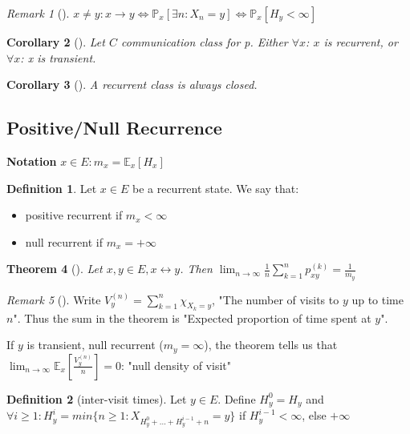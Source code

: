 \documentclass[12pt]{book}
\renewcommand{\iff}{\Leftrightarrow}
\newtheorem{theorem}{Theorem}[section]
\newtheorem{cor}[theorem]{Corollary}
\theoremstyle{definition}
\newtheorem{defn}{Definition}[section]
\theoremstyle{remark}
\newtheorem{rmk}[theorem]{Remark}
\begin{document}
\begin{rmk}[]
	$x \neq y: x \to y \iff \mathbb{P}_{x} \left[ \exists n: X_n=y \right] \iff \mathbb{P}_{x} \left[ H_y<\infty \right] $
\end{rmk}

\begin{cor}[]
	Let $C$ communication class for p. Either $\forall x$: $x$ is recurrent, or $\forall x$: x is transient.
\end{cor}

\begin{cor}[]
	A recurrent class is always closed.
\end{cor}

\subsection{Positive/Null Recurrence}
\textbf{Notation} $x \in E: m_{x}=\mathbb{E}_{x} \left[ H_x \right] $

\begin{defn}
	Let $x \in E$ be a recurrent state. We say that:
\begin{itemize}
	\item positive recurrent if $m_x<\infty$ 
	\item null recurrent if $m_x=+\infty$
\end{itemize}

\end{defn}

\begin{theorem}[]
	Let $x,y \in E, x \leftrightarrow y$. Then $\lim_{n \to \infty}\frac{1}{n}\sum_{k=1}^{n} p_{xy}^{(k)}=\frac{1}{m_{y}}$
\end{theorem}
\begin{rmk}[]
	Write $V_{y}^{(n)}=\sum_{k=1}^{n} \chi_{X_k=y}$, "The number of visits to $y$ up to time $n$". Thus the sum in the theorem is "Expected proportion of time spent at $y$".
\end{rmk}

If $y$ is transient, null recurrent ($m_y=\infty$), the theorem tells us that $\lim_{n \to \infty}\mathbb{E}_{x} \left[ \frac{V_y^{(n)}}{n} \right] =0$: "null density of visit"

\begin{defn}[inter-visit times]
	Let $y \in E$. Define $H_y^{0}=H_y$ and $\forall i\geq 1: H_{y}^{i}= min\{n \geq 1: X_{H_y^0 + ... + H_y^{i-1}+n}=y\}$ if $H_y^{i-1}<\infty$, else $+\infty$	
\end{defn}
\end{document}

